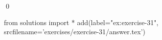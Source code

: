 
\begin{ex} 
  \label{ex:exercise-31}
  
  \qed
\end{ex} 
\begin{python0}
from solutions import *
add(label="ex:exercise-31",
    srcfilename='exercises/exercise-31/answer.tex') 
\end{python0}
